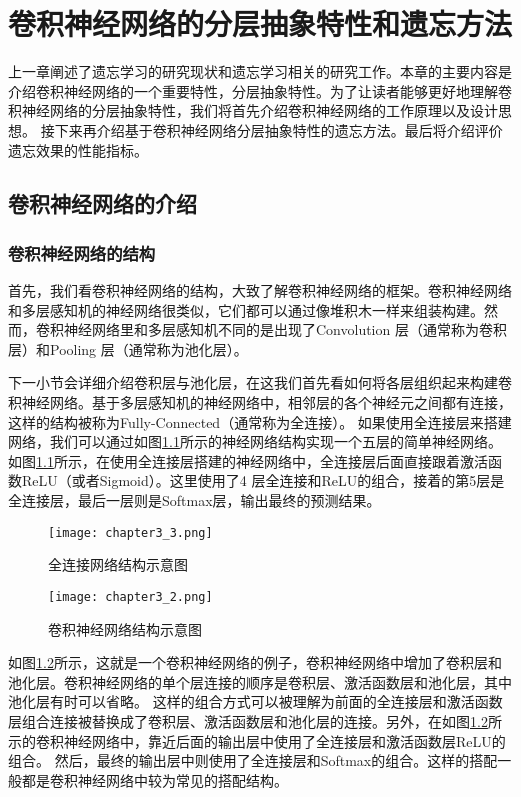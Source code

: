 
\chapter{卷积神经网络的分层抽象特性和遗忘方法}
上一章阐述了遗忘学习的研究现状和遗忘学习相关的研究工作。本章的主要内容是介绍卷积神经网络的一个重要特性，分层抽象特性。为了让读者能够更好地理解卷积神经网络的分层抽象特性，我们将首先介绍卷积神经网络的工作原理以及设计思想。
接下来再介绍基于卷积神经网络分层抽象特性的遗忘方法。最后将介绍评价遗忘效果的性能指标。

\section{卷积神经网络的介绍}

\subsection{卷积神经网络的结构}

首先，我们看卷积神经网络的结构，大致了解卷积神经网络的框架。卷积神经网络和多层感知机的神经网络很类似，它们都可以通过像堆积木一样来组装构建。然而，卷积神经网络里和多层感知机不同的是出现了Convolution 层（通常称为卷积层）和Pooling 层（通常称为池化层）。

下一小节会详细介绍卷积层与池化层，在这我们首先看如何将各层组织起来构建卷积神经网络。基于多层感知机的神经网络中，相邻层的各个神经元之间都有连接，这样的结构被称为Fully-Connected（通常称为全连接）。
如果使用全连接层来搭建网络，我们可以通过如图\ref{fig:chapter3_3}所示的神经网络结构实现一个五层的简单神经网络。
如图\ref{fig:chapter3_3}所示，在使用全连接层搭建的神经网络中，全连接层后面直接跟着激活函数ReLU（或者Sigmoid）。这里使用了4 层全连接和ReLU的组合，接着的第5层是全连接层，最后一层则是Softmax层，输出最终的预测结果。
\begin{figure}
    \centering
    \texttt{[image: chapter3\_3.png]}
    \caption{全连接网络结构示意图\cite{luyujie_216}}
    \label{fig:chapter3_3}
\end{figure}
\begin{figure}
    \centering
    \texttt{[image: chapter3\_2.png]}
    \caption{卷积神经网络结构示意图\cite{luyujie_216}}
    \label{fig:chapter3_2}
\end{figure}

如图\ref{fig:chapter3_2}所示，这就是一个卷积神经网络的例子，卷积神经网络中增加了卷积层和池化层。卷积神经网络的单个层连接的顺序是卷积层、激活函数层和池化层，其中池化层有时可以省略。
这样的组合方式可以被理解为前面的全连接层和激活函数层组合连接被替换成了卷积层、激活函数层和池化层的连接。另外，在如图\ref{fig:chapter3_2}所示的卷积神经网络中，靠近后面的输出层中使用了全连接层和激活函数层ReLU的组合。
然后，最终的输出层中则使用了全连接层和Softmax的组合。这样的搭配一般都是卷积神经网络中较为常见的搭配结构。

